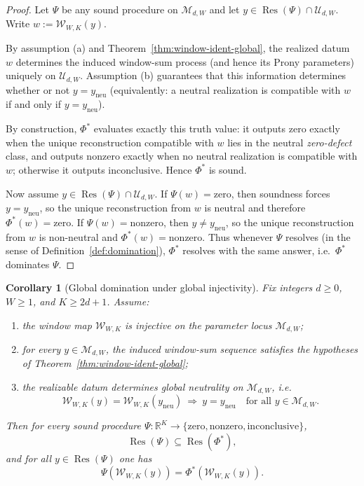 \documentclass[11pt,reqno]{amsart}
\newtheorem{corollary}[theorem]{Corollary}
\theoremstyle{definition}
\theoremstyle{remark}
\newcommand{\R}{\mathbb{R}}
\newcommand{\1}{\mathbf{1}}
\newcommand{\zero}{\mathrm{zero}}
\newcommand{\nonzero}{\mathrm{nonzero}}
\newcommand{\inconclusive}{\mathrm{inconclusive}}
\begin{document}
\begin{proof}
Let $\Psi$ be any sound procedure on $\mathcal{M}_{d,W}$ and let $y\in\operatorname{Res}(\Psi)\cap\mathcal{U}_{d,W}$.
Write $w:=\mathcal{W}_{W,K}(y)$.


By assumption (a) and Theorem~\ref{thm:window-ident-global}, the realized datum $w$ determines the induced window-sum process (and hence its Prony parameters) uniquely on $\mathcal{U}_{d,W}$.
Assumption (b) guarantees that this information determines whether or not $y=y_{\mathrm{neu}}$ (equivalently: a neutral realization is compatible with $w$ if and only if $y=y_{\mathrm{neu}}$).

By construction, $\Phi^\ast$ evaluates exactly this truth value: it outputs $\zero$ exactly when the unique
reconstruction compatible with $w$ lies in the neutral \emph{zero-defect} class, and outputs $\nonzero$ exactly when
no neutral realization is compatible with $w$; otherwise it outputs $\inconclusive$.
Hence $\Phi^\ast$ is sound.

Now assume $y\in\operatorname{Res}(\Psi)\cap\mathcal{U}_{d,W}$. If $\Psi(w)=\zero$, then soundness forces $y=y_{\mathrm{neu}}$, so the unique
reconstruction from $w$ is neutral and therefore $\Phi^\ast(w)=\zero$.
If $\Psi(w)=\nonzero$, then $y\neq y_{\mathrm{neu}}$, so the unique reconstruction from $w$ is non-neutral and
$\Phi^\ast(w)=\nonzero$.
Thus whenever $\Psi$ resolves (in the sense of Definition~\ref{def:domination}), $\Phi^\ast$ resolves with the same answer, i.e.\ $\Phi^\ast$ dominates $\Psi$.
\end{proof}


\begin{corollary}[Global domination under global injectivity]\label{cor:domination-global}
Fix integers $d\ge 0$, $W\ge 1$, and $K\ge 2d+1$.
Assume:
\begin{enumerate}[label=\textup{(\alph*)},leftmargin=2.2em]
\item the window map $\mathcal{W}_{W,K}$ is injective on the parameter locus $\mathcal M_{d,W}$;
\item for every $y\in\mathcal M_{d,W}$, the induced window-sum sequence satisfies the hypotheses of Theorem~\ref{thm:window-ident-global};
\item the realizable datum determines global neutrality on $\mathcal M_{d,W}$, i.e.
\[
\mathcal{W}_{W,K}(y)=\mathcal{W}_{W,K}(y_{\mathrm{neu}})\ \Longrightarrow\ y=y_{\mathrm{neu}}
\quad\text{for all }y\in\mathcal M_{d,W}.
\]
\end{enumerate}
Then for every sound procedure $\Psi:\R^K\to\{\zero,\nonzero,\inconclusive\}$,
\[
\operatorname{Res}(\Psi)\subseteq \operatorname{Res}(\Phi^\ast),
\]
and for all $y\in\operatorname{Res}(\Psi)$ one has
\[
\Psi(\mathcal W_{W,K}(y))=\Phi^\ast(\mathcal W_{W,K}(y)).
\]
\end{corollary}
\end{document}
